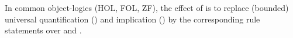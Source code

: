 \begin{isabellebody}
\begin{isamarkuptext}
\begin{descr}
  In common object-logics (HOL, FOL, ZF), the effect of \mbox{} is to replace (bounded) universal quantification
  (\isa{{\isachardoublequote}{\isasymforall}{\isachardoublequote}}) and implication (\isa{{\isachardoublequote}{\isasymlongrightarrow}{\isachardoublequote}}) by the corresponding
  rule statements over \isa{{\isachardoublequote}{\isasymAnd}{\isachardoublequote}} and \isa{{\isachardoublequote}{\isasymLongrightarrow}{\isachardoublequote}}.

  \end{descr}%
\end{isamarkuptext}%
\isamarkuptrue%
%
\isadelimtheory
%
\endisadelimtheory
%
\isatagtheory
{}\isamarkupfalse%
%
\endisatagtheory
{\isafoldtheory}%
%
\isadelimtheory
%
\endisadelimtheory
\isanewline
\end{isabellebody}%
